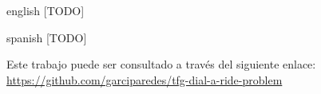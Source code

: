 \documentclass{subfiles}
\newenvironment{abstractpage}
  {\cleardoublepage\vspace*{\fill}\thispagestyle{empty}}
  {\vfill\cleardoublepage}
\newenvironment{abstract-lang}[1]
  {\bigskip\selectlanguage{#1}%
   \begin{center}\bfseries\abstractname\end{center}}
  {\par\bigskip}
\begin{document}
  \begin{abstractpage}
    \begin{abstract-lang}{english}
      [TODO]
    \end{abstract-lang}
    \begin{abstract-lang}{spanish}
      [TODO]
    \end{abstract-lang}

    \centering
    Este trabajo puede ser consultado a través del siguiente enlace: \url{https://github.com/garciparedes/tfg-dial-a-ride-problem}

  \end{abstractpage}
\end{document}
